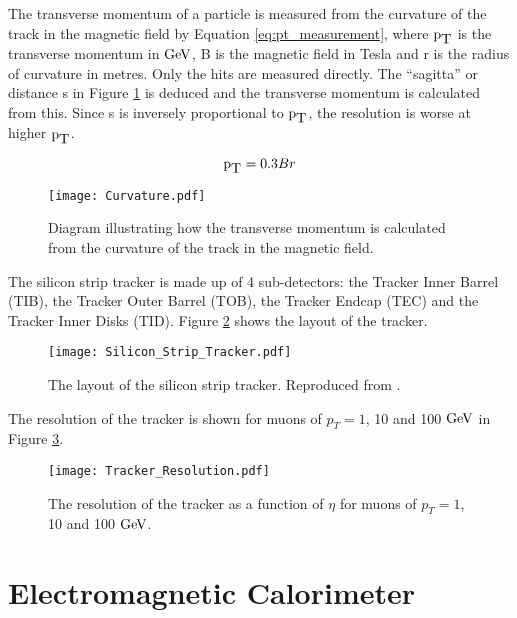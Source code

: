 The transverse momentum of a particle is measured from the curvature of the 
track in the magnetic field by Equation \ref{eq:pt_measurement}, where $\mbox{p}_{\mbox{T}}$ is
the transverse momentum in $\mbox{GeV}$, B is the magnetic field in Tesla and r is the
radius of curvature in metres. Only the hits are measured directly. The 
``sagitta'' or distance s in Figure \ref{fig:curvature} is deduced and the 
transverse momentum is calculated from this. Since s is inversely proportional 
to $\mbox{p}_{\mbox{T}}$, the resolution is worse at higher $\mbox{p}_{\mbox{T}}$.

\begin{equation}
\mbox{p}_{\mbox{T}} = 0.3Br
\label{eq:pt_measurement}
\end{equation}

\begin{figure}
\begin{center}
\texttt{[image: Curvature.pdf]}
\end{center}
\caption{Diagram illustrating how the transverse momentum is calculated from the
curvature of the track in the magnetic field.}
\label{fig:curvature}
\end{figure}

The silicon strip tracker is made up of 4 sub-detectors: the Tracker Inner 
Barrel (TIB), the Tracker Outer Barrel (TOB), the Tracker Endcap (TEC) and the
Tracker Inner Disks (TID). Figure \ref{fig:Silicon_Strip_Tracker} shows the 
layout of the tracker. \\

\begin{figure}
\texttt{[image: Silicon\_Strip\_Tracker.pdf]}
\caption{The layout of the silicon strip tracker. Reproduced from 
\cite{physics_tdr_1}.}
\label{fig:Silicon_Strip_Tracker}
\end{figure}

The resolution of the tracker is shown for muons of $p_{T} = 1$, 10 and 100 
$\mbox{GeV}$ in Figure \ref{fig:tracker_resolution}.

\begin{figure}
\texttt{[image: Tracker\_Resolution.pdf]}
\caption{The resolution of the tracker as a function of $\eta$ for muons of
$p_{T} = 1$, 10 and 100 $\mbox{GeV}$.}
\label{fig:tracker_resolution}
\end{figure}

\section{Electromagnetic Calorimeter}


